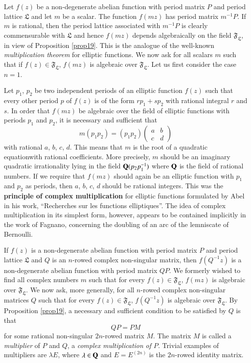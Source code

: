 Let $f(z)$ be a non-degenerate abelian function with period matrix $P$
and period lattice $\mathfrak{L}$ and let $m$ be a scalar. The
function $f(mz)$ has period matrix $m^{-1}P$. If $m$ is rational, then
the period lattice associated with $m^{-1}P$ is clearly commensurable
with $\mathfrak{L}$ and hence $f(mz)$ depends algebraically on the
field $\mathfrak{F}_{\mathfrak{L}}$, in view of Proposition
\ref{prop19}. This is the analogue of the well-known {\em
  multiplication theorem} for elliptic functions. We now ask for all
scalars $m$ such that if $f(z)\in\mathfrak{F}_{\mathfrak{L}}$, $f(mz)$
is algebraic over $\mathfrak{F}_{\mathfrak{L}}$. Let us first consider
the case $n=1$.

Let $p_{1}$, $p_{2}$ be two independent periods of an elliptic
function $f(z)$ such that every other period $p$ of $f(z)$ is of the
form $rp_{1}+sp_{2}$ with rational integral $r$ and $s$. In order that
$f(mz)$ be algebraic over the field of elliptic functions with periods
$p_{1}$ and $p_{2}$, it is necessary and sufficient that
$$
m(p_{1}p_{2})=(p_{1}p_{2})
\begin{pmatrix}
a & b\\
c & d 
\end{pmatrix}
$$
with rational $a$, $b$, $c$, $d$. This means that $m$ is the root of a
quadratic equation\pageoriginale with rational coefficients. More
precisely, $m$ should be an imaginary quadratic irrationality lying in
the field $\mathbf{Q}(p_{2}p^{-1}_{1})$ where $\mathbf{Q}$ is the field of rational
numbers. If we require that $f(mz)$ should again be an elliptic
function with $p_{1}$ and $p_{2}$ as periods, then $a$, $b$, $c$, $d$
should be rational integers. This was the {\bf principle of complex
  multiplication} for elliptic functions formulated by Abel in his
work, ``Recherches sur les functions elliptiques''. The idea of
complex multiplication in its simplest form, however, appears to be
contained implicitly in the work of Fagnano, concerning the doubling
of an arc of the lemniscate of Bernoulli.

If $f(z)$ is a non-degenerate abelian function with period matrix $P$
and period lattice $\mathfrak{L}$ and $Q$ is an $n$-rowed complex
non-singular matrix, then $f(Q^{-1}z)$ is a non-degenerate abelian
function with period matrix $QP$. We formerly wished to find all
complex numbers $m$ such that for every
$f(z)\in\mathfrak{F}_{\mathfrak{L}}$, $f(mz)$ is algebraic over
$\mathfrak{F}_{\mathfrak{L}}$. We now ask, more generally, for all
$n$-rowed complex non-singular matrices $Q$ such that for every
$f(z)\in\mathfrak{F}_{\mathfrak{L}}$, $f(Q^{-1}z)$ is algebraic over
$\mathfrak{F}_{\mathfrak{L}}$. By Proposition \ref{prop19}, a
necessary and sufficient condition to be satisfied by $Q$ is that
\begin{equation*}
QP=PM\tag{135}\label{135}
\end{equation*}
for some rational non-singular $2n$-rowed matrix $M$. The matrix $M$
is called a {\em multiplier} of $P$ and $Q$, a {\em complex
  multiplication of $P$.} Trivial examples of multipliers are $\lambda
E$, where $\lambda\in \mathbf{Q}$ and $E=E^{(2n)}$ is the $2n$-rowed identity
matrix.

